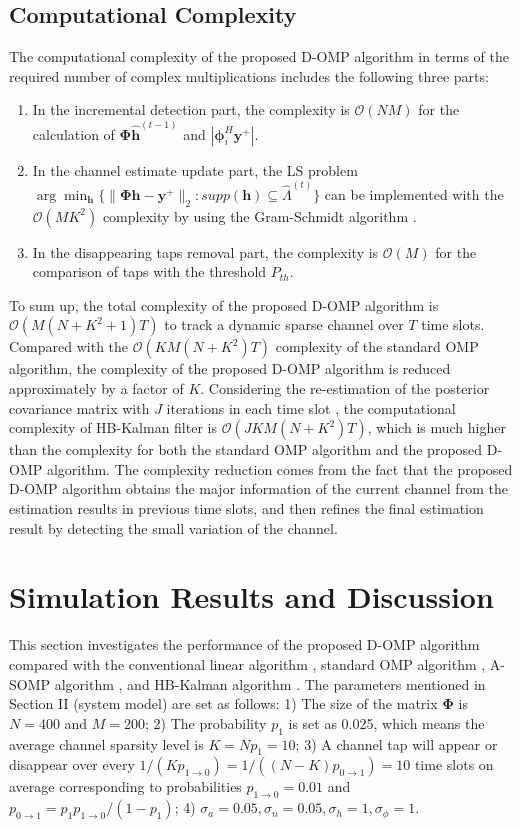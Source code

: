 \documentclass[conference]{IEEEtran}
\begin{document}
\subsection{Computational Complexity}
The computational complexity of the proposed D-OMP algorithm in terms of the required number of complex multiplications includes the following three parts:
\begin{enumerate}
  \item In the incremental detection part, the complexity is $\mathcal{O}(NM)$ for the calculation of $\mathbf{\Phi}\hat{\mathbf{h}}^{(t-1)}$ and $|\boldsymbol{\phi}_i^H\mathbf{y}^{+}|$.
  \item In the channel estimate update part, the LS problem $\arg\min_{\mathbf{h}}\{\|\mathbf{\Phi}\mathbf{h}-\mathbf{y}^{+}\|_2: supp(\mathbf{h})\subseteq\hat{\Lambda}^{(t)}\}$ can be implemented with the $\mathcal{O}(MK^2)$ complexity by using the Gram-Schmidt algorithm \cite{GS}.
  \item In the disappearing taps removal part, the complexity is $\mathcal{O}(M)$ for the comparison of taps with the threshold $P_{th}$.
\end{enumerate}

To sum up, the total complexity of the proposed D-OMP algorithm is $\mathcal{O}(M(N+K^2+1)T)$ to track a dynamic sparse channel over $T$ time slots.
Compared with the $\mathcal{O}(KM(N+K^2)T)$ complexity of the standard OMP algorithm, the complexity of the proposed D-OMP algorithm is reduced approximately by a factor of $K$.
Considering the re-estimation of the posterior covariance matrix with $J$ iterations in each time slot \cite{BayesianCS}, the computational complexity of HB-Kalman filter \cite{HB-Kalman} is $\mathcal{O}(JKM(N+K^2)T)$, which is much higher than the complexity for both the standard OMP algorithm and the proposed D-OMP algorithm.
The complexity reduction comes from the fact that the proposed D-OMP algorithm obtains the major information of the current channel from the estimation results in previous time slots, and then refines the final estimation result by detecting the small variation of the channel.

\section{Simulation Results and Discussion}
This section investigates the performance of the proposed D-OMP algorithm compared with the conventional linear algorithm \cite{lce}, standard OMP algorithm \cite{GG1}, A-SOMP algorithm \cite{A-SOMP}, and HB-Kalman algorithm \cite{HB-Kalman}.
The parameters mentioned in Section II (system model) are set as follows: 1) The size of the matrix $\mathbf{\Phi}$ is $N=400$ and $M=200$; 2) The probability $p_1$ is set as 0.025, which means the average channel sparsity level is $K=N p_1=10$; 3) A channel tap will appear or disappear over every $1/(K p_{1\rightarrow 0})=1/((N-K) p_{0\rightarrow 1})=10$ time slots on average corresponding to probabilities $p_{1\rightarrow0}=0.01$ and $p_{0\rightarrow1}=p_1p_{1\rightarrow0}/(1-p_1)$; 4) $\sigma_a=0.05, \sigma_n=0.05, \sigma_h=1, \sigma_{\phi}=1$.
\end{document}
